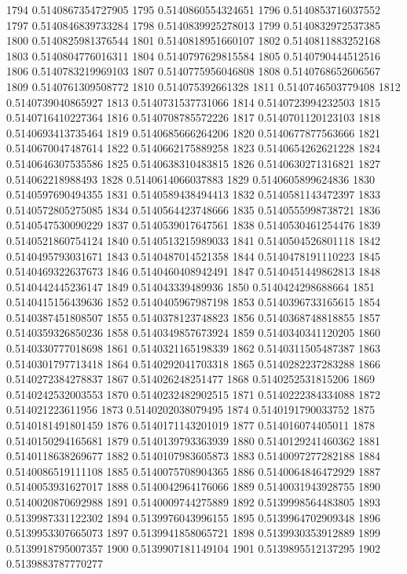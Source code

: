 1794 0.5140867354727905
1795 0.5140860554324651
1796 0.5140853716037552
1797 0.5140846839733284
1798 0.5140839925278013
1799 0.5140832972537385
1800 0.5140825981376544
1801 0.5140818951660107
1802 0.5140811883252168
1803 0.5140804776016311
1804 0.5140797629815584
1805 0.5140790444512516
1806 0.5140783219969103
1807 0.5140775956046808
1808 0.5140768652606567
1809 0.5140761309508772
1810 0.514075392661328
1811 0.5140746503779408
1812 0.5140739040865927
1813 0.5140731537731066
1814 0.5140723994232503
1815 0.5140716410227364
1816 0.5140708785572226
1817 0.5140701120123103
1818 0.5140693413735464
1819 0.5140685666264206
1820 0.5140677877563666
1821 0.5140670047487614
1822 0.5140662175889258
1823 0.5140654262621228
1824 0.5140646307535586
1825 0.5140638310483815
1826 0.5140630271316821
1827 0.514062218988493
1828 0.5140614066037883
1829 0.5140605899624836
1830 0.5140597690494355
1831 0.5140589438494413
1832 0.5140581143472397
1833 0.5140572805275085
1834 0.5140564423748666
1835 0.5140555998738721
1836 0.5140547530090229
1837 0.5140539017647561
1838 0.5140530461254476
1839 0.5140521860754124
1840 0.5140513215989033
1841 0.5140504526801118
1842 0.5140495793031671
1843 0.5140487014521358
1844 0.5140478191110223
1845 0.5140469322637673
1846 0.5140460408942491
1847 0.5140451449862813
1848 0.5140442445236147
1849 0.514043339489936
1850 0.5140424298688664
1851 0.5140415156439636
1852 0.5140405967987198
1853 0.5140396733165615
1854 0.5140387451808507
1855 0.5140378123748823
1856 0.5140368748818855
1857 0.5140359326850236
1858 0.5140349857673924
1859 0.5140340341120205
1860 0.5140330777018698
1861 0.5140321165198339
1862 0.5140311505487387
1863 0.5140301797713418
1864 0.5140292041703318
1865 0.5140282237283288
1866 0.5140272384278837
1867 0.514026248251477
1868 0.5140252531815206
1869 0.5140242532003553
1870 0.5140232482902515
1871 0.5140222384334088
1872 0.514021223611956
1873 0.5140202038079495
1874 0.5140191790033752
1875 0.5140181491801459
1876 0.5140171143201019
1877 0.514016074405011
1878 0.5140150294165681
1879 0.5140139793363939
1880 0.5140129241460362
1881 0.5140118638269677
1882 0.5140107983605873
1883 0.5140097277282188
1884 0.5140086519111108
1885 0.5140075708904365
1886 0.5140064846472929
1887 0.5140053931627017
1888 0.5140042964176066
1889 0.5140031943928755
1890 0.5140020870692988
1891 0.5140009744275889
1892 0.5139998564483805
1893 0.5139987331122302
1894 0.5139976043996155
1895 0.5139964702909348
1896 0.5139953307665073
1897 0.5139941858065721
1898 0.5139930353912889
1899 0.5139918795007357
1900 0.5139907181149104
1901 0.5139895512137295
1902 0.5139883787770277
